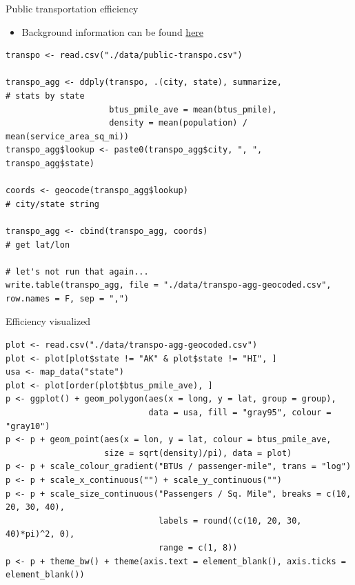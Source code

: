 \documentclass[sans,aspectratio=169,presentation,bigger,fleqn]{beamer}
\begin{document}
\begin{frame}[fragile,label=sec-28]{Public transportation efficiency}
 \begin{itemize}
\item Background information can be found \href{https://github.com/tcrug/public-transpo}{here}
\end{itemize}

\scriptsize

\begin{verbatim}
transpo <- read.csv("./data/public-transpo.csv")

transpo_agg <- ddply(transpo, .(city, state), summarize,                    # stats by state
                     btus_pmile_ave = mean(btus_pmile),
                     density = mean(population) / mean(service_area_sq_mi))
transpo_agg$lookup <- paste0(transpo_agg$city, ", ", transpo_agg$state)

coords <- geocode(transpo_agg$lookup)                                       # city/state string

transpo_agg <- cbind(transpo_agg, coords)                                   # get lat/lon

# let's not run that again...
write.table(transpo_agg, file = "./data/transpo-agg-geocoded.csv", row.names = F, sep = ",")
\end{verbatim}
\normalsize
\end{frame}
\begin{frame}[fragile,label=sec-29]{Efficiency visualized}
 \scriptsize

\begin{verbatim}
plot <- read.csv("./data/transpo-agg-geocoded.csv")
plot <- plot[plot$state != "AK" & plot$state != "HI", ]
usa <- map_data("state")
plot <- plot[order(plot$btus_pmile_ave), ]
p <- ggplot() + geom_polygon(aes(x = long, y = lat, group = group),
                             data = usa, fill = "gray95", colour = "gray10")
p <- p + geom_point(aes(x = lon, y = lat, colour = btus_pmile_ave,
                    size = sqrt(density)/pi), data = plot)
p <- p + scale_colour_gradient("BTUs / passenger-mile", trans = "log")
p <- p + scale_x_continuous("") + scale_y_continuous("")
p <- p + scale_size_continuous("Passengers / Sq. Mile", breaks = c(10, 20, 30, 40),
                               labels = round((c(10, 20, 30, 40)*pi)^2, 0),
                               range = c(1, 8))
p <- p + theme_bw() + theme(axis.text = element_blank(), axis.ticks = element_blank())
\end{verbatim}

\normalsize
\end{frame}
\end{document}
